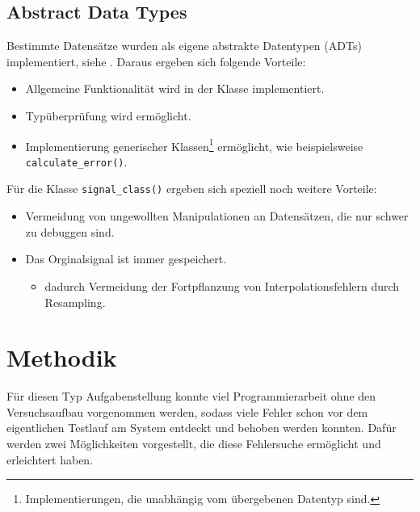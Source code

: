\documentclass[../Report.tex]{subfiles}
\begin{document}
\subsection*{Abstract Data Types}
\label{subsec:code.adt}
Bestimmte Datensätze wurden als eigene abstrakte Datentypen (ADTs) implementiert, siehe \cite[Kap. 6.1]{mcConnell}. Daraus ergeben sich folgende Vorteile:
\begin{itemize}
	\item Allgemeine Funktionalität wird in der Klasse implementiert.
	\item Typüberprüfung wird ermöglicht.
	\item Implementierung generischer Klassen\footnote{Implementierungen, die unabhängig vom übergebenen Datentyp sind.} ermöglicht, wie beispielsweise \lstinline{calculate_error()}.
\end{itemize}
Für die Klasse \lstinline{signal_class()} ergeben sich speziell noch weitere Vorteile:
\begin{itemize}
\item Vermeidung von ungewollten Manipulationen an Datensätzen, die nur schwer zu debuggen sind.
	\item Das Orginalsignal ist immer gespeichert.
	\begin{itemize}
		\item dadurch Vermeidung der Fortpflanzung von Interpolationsfehlern durch Resampling.
	\end{itemize}
\end{itemize}

\section{Methodik}
\label{subsec:code.methodik}
Für diesen Typ Aufgabenstellung konnte viel Programmierarbeit ohne den Versuchsaufbau vorgenommen werden, sodass viele Fehler schon vor dem eigentlichen Testlauf am System entdeckt und behoben werden konnten. Dafür werden zwei Möglichkeiten vorgestellt, die diese Fehlersuche ermöglicht und erleichtert haben.
\end{document}
